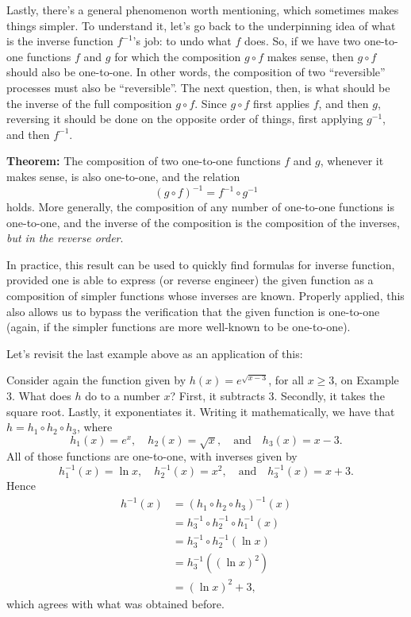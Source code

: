 \documentclass[nooutcomes]{ximera}
\begin{document}
Lastly, there's a general phenomenon worth mentioning, which sometimes makes things simpler. To understand it, let's go back to the underpinning idea of what is the inverse function $f^{-1}$'s job: to undo what $f$ does.  So, if we have two one-to-one functions $f$ and $g$ for which the composition $g\circ f$ makes sense, then $g\circ f$ should also be one-to-one. In other words, the composition of two ``reversible'' processes must also be ``reversible''. The next question, then, is what should be the inverse of the full composition $g\circ f$. Since $g\circ f$ first applies $f$, and then $g$, reversing it should be done on the opposite order of things, first applying $g^{-1}$, and then $f^{-1}$.

\begin{callout}
  {\bf Theorem:} The composition of two one-to-one functions $f$ and $g$, whenever it makes sense, is also one-to-one, and the relation $$(g\circ f)^{-1} = f^{-1}\circ g^{-1}$$ holds. More generally, the composition of any number of one-to-one functions is one-to-one, and the inverse of the composition is the composition of the inverses, \emph{but in the reverse order}.
\end{callout}

In practice, this result can be used to quickly find formulas for inverse function, provided one is able to express (or reverse engineer) the given function as a composition of simpler functions whose inverses are known. Properly applied, this also allows us to bypass the verification that the given function is one-to-one (again, if the simpler functions are more well-known to be one-to-one). 

Let's revisit the last example above as an application of this:

\begin{example}
Consider again the function given by $h(x) = e^{\sqrt{x-3}}$, for all $x\geq 3$, on Example 3. What does $h$ do to a number $x$? First, it subtracts $3$. Secondly, it takes the square root. Lastly, it exponentiates it. Writing it mathematically, we have that $h = h_1\circ h_2\circ h_3$, where $$h_1(x) =e^x,\quad h_2(x) = \sqrt{x},\quad\mbox{and}\quad h_3(x)= x-3.$$All of those functions are one-to-one, with inverses given by $$h_1^{-1}(x) = \ln x,\quad h_2^{-1}(x) = x^2,\quad\mbox{and}\quad h_3^{-1}(x) = x+3.$$Hence \begin{align*}h^{-1}(x) &= (h_1\circ h_2\circ h_3)^{-1}(x) \\ &= h_3^{-1}\circ h_2^{-1} \circ h_1^{-1}(x) \\ &= h_3^{-1}\circ h_2^{-1}(\ln x) \\ &= h_3^{-1}((\ln x)^2) \\ &= (\ln x)^2 + 3, \end{align*}which agrees with what was obtained before.
\end{example}
\end{document}
